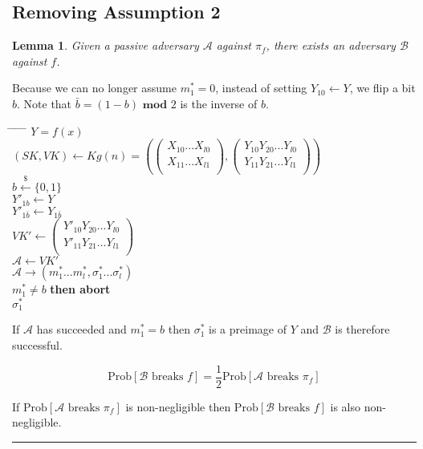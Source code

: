 \documentclass[twoside]{article}
\newtheorem{lemma}[theorem]{Lemma}
\newenvironment{proof}{{\bf Proof:}}{\hfill\rule{2mm}{2mm}}
\begin{document}
\subsection{Removing Assumption 2}

\begin{lemma}
Given a passive adversary $\mathcal{A}$ against $\pi_f$, there exists an adversary $\mathcal{B}$ against $f$.
\end{lemma}

\begin{proof}
Because we can no longer assume $m^*_1 = 0$, instead of setting $Y_{10} \leftarrow Y$, we flip a bit $b$. Note that $\bar{b} = (1 - b) \textbf{ mod } 2$ is the inverse of $b$.

\begin{tabbing}
\hspace*{.25in} \= \hspace*{.25in} \= \hspace*{.25in} \= \hspace*{.25in} \= \hspace*{.25in} \=\kill
{} $Y = f(x)$\\
\>$(SK, VK) \leftarrow Kg(n) = \left(
\begin{pmatrix}
X_{10}...X_{l0}\\
X_{11}...X_{l1}\\
\end{pmatrix},
\begin{pmatrix}
Y_{10}Y_{20}...Y_{l0}\\
Y_{11}Y_{21}...Y_{l1}\\
\end{pmatrix}\right)$\\
\>$b \xleftarrow{\$} \{0,1\}$\\
\>$Y'_{1b} \leftarrow Y$\\
\>$Y'_{1\bar{b}} \leftarrow Y_{1\bar{b}}$\\
\>$VK' \leftarrow
\begin{pmatrix}
Y'_{10}Y_{20}...Y_{l0}\\
Y'_{11}Y_{21}...Y_{l1}\\
\end{pmatrix}$\\
\>$\mathcal{A} \leftarrow VK'$\\
\>$\mathcal{A} \rightarrow (m^*_1...m^*_l,\sigma^*_1...\sigma^*_l)$\\
 $m^*_1 \neq b$ {\bf then abort}\\
 $\sigma^*_1$
\end{tabbing}

If $\mathcal{A}$ has succeeded and $m^*_1 = b$ then $\sigma_1^*$ is a preimage of $Y$ and $\mathcal{B}$ is therefore successful.

$$\text{Prob}[\mathcal{B}\text{ breaks }f] = \frac{1}{2}\text{Prob}[\mathcal{A}\text{ breaks }\pi_f]$$

If $\text{Prob}[\mathcal{A}\text{ breaks }\pi_f]$ is non-negligible then $\text{Prob}[\mathcal{B}\text{ breaks }f]$ is also non-negligible.
\end{proof}
\end{document}
